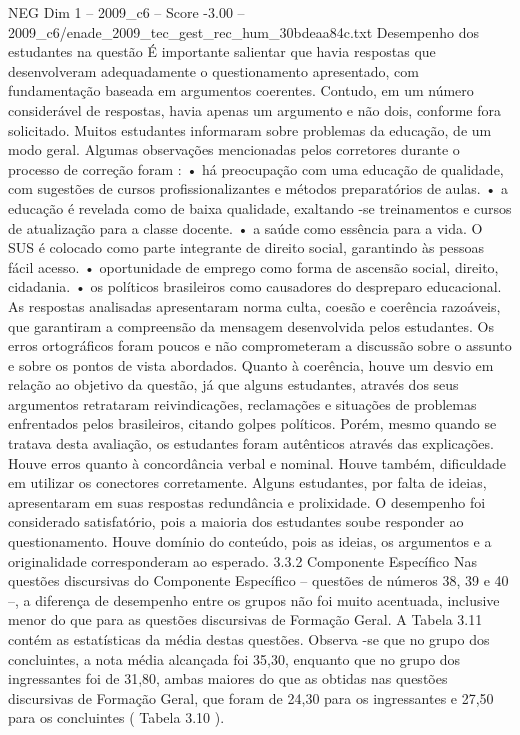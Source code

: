 \begin{textsample}{NEG Dim 1 – 2009\_c6 – Score -3.00 – 2009\_c6/enade\_2009\_tec\_gest\_rec\_hum\_30bdeaa84c.txt}
Desempenho dos estudantes na questão É importante salientar que havia respostas que desenvolveram adequadamente o questionamento apresentado, com fundamentação baseada em argumentos coerentes.
Contudo, em um número considerável de respostas, havia apenas um argumento e não dois, conforme fora solicitado.
Muitos estudantes informaram sobre problemas da educação, de um modo geral.
Algumas observações mencionadas pelos corretores durante o processo de correção foram : • há preocupação com uma educação de qualidade, com sugestões de cursos profissionalizantes e métodos preparatórios de aulas. • a educação é revelada como de baixa qualidade, exaltando -se treinamentos e cursos de atualização para a classe docente. • a saúde como essência para a vida.
O SUS é colocado como parte integrante de direito social, garantindo às pessoas fácil acesso. • oportunidade de emprego como forma de ascensão social, direito, cidadania. • os políticos brasileiros como causadores do despreparo educacional.
As respostas analisadas apresentaram norma culta, coesão e coerência razoáveis, que garantiram a compreensão da mensagem desenvolvida pelos estudantes.
Os erros ortográficos foram poucos e não comprometeram a discussão sobre o assunto e sobre os pontos de vista abordados.
Quanto à coerência, houve um desvio em relação ao objetivo da questão, já que alguns estudantes, através dos seus argumentos retrataram reivindicações, reclamações e situações de problemas enfrentados pelos brasileiros, citando golpes políticos.
Porém, mesmo quando se tratava desta avaliação, os estudantes foram autênticos através das explicações.
Houve erros quanto à concordância verbal e nominal.
Houve também, dificuldade em utilizar os conectores corretamente.
Alguns estudantes, por falta de ideias, apresentaram em suas respostas redundância e prolixidade.
O desempenho foi considerado satisfatório, pois a maioria dos estudantes soube responder ao questionamento.
Houve domínio do conteúdo, pois as ideias, os argumentos e a originalidade corresponderam ao esperado. 3.3.2 Componente Específico Nas questões discursivas do Componente Específico – questões de números 38, 39 e 40 –, a diferença de desempenho entre os grupos não foi muito acentuada, inclusive menor do que para as questões discursivas de Formação Geral.
A Tabela 3.11 contém as estatísticas da média destas questões.
Observa -se que no grupo dos concluintes, a nota média alcançada foi 35,30, enquanto que no grupo dos ingressantes foi de 31,80, ambas maiores do que as obtidas nas questões discursivas de Formação Geral, que foram de 24,30 para os ingressantes e 27,50 para os concluintes ( Tabela 3.10 ).

\end{textsample}

